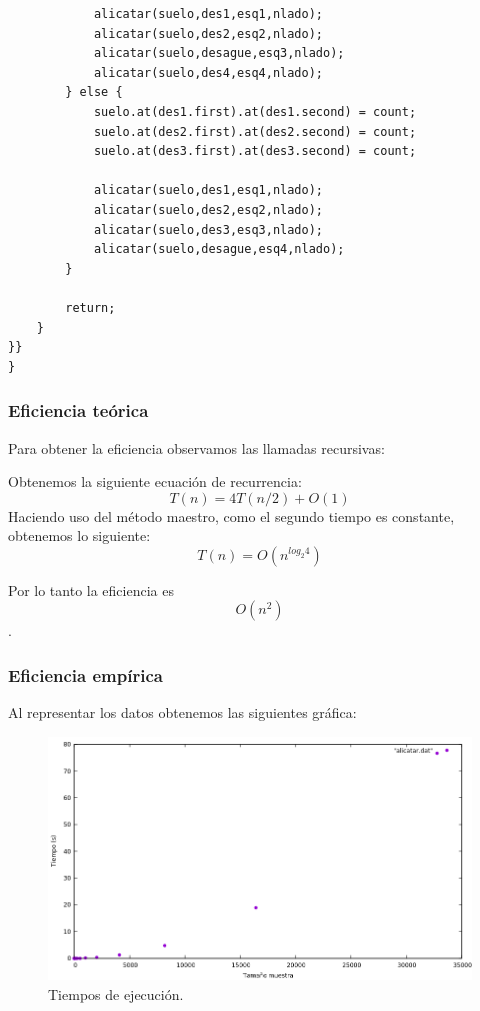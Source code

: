 \begin{lstlisting}
            alicatar(suelo,des1,esq1,nlado);
            alicatar(suelo,des2,esq2,nlado);
            alicatar(suelo,desague,esq3,nlado);
            alicatar(suelo,des4,esq4,nlado);
        } else {
            suelo.at(des1.first).at(des1.second) = count;
            suelo.at(des2.first).at(des2.second) = count;
            suelo.at(des3.first).at(des3.second) = count;

            alicatar(suelo,des1,esq1,nlado);
            alicatar(suelo,des2,esq2,nlado);
            alicatar(suelo,des3,esq3,nlado);
            alicatar(suelo,desague,esq4,nlado);
        }

        return;
    }
}}    
}
\end{lstlisting}


\subsubsection{Eficiencia teórica}

Para obtener la eficiencia observamos las llamadas recursivas:

 Obtenemos la siguiente ecuación de recurrencia:
  \begin{equation}
      T(n) = 4T(n/2) + O(1)
  \end{equation}
  Haciendo uso del método maestro, como el segundo tiempo es constante, obtenemos lo siguiente:
  \begin{equation}
      T(n) = O(n^{log_2{4}})
  \end{equation}
  
  Por lo tanto la eficiencia es
  \begin{equation} O(n^2 ) \end{equation}.
  

\subsubsection{Eficiencia empírica}

Al representar los datos obtenemos las siguientes gráfica:

\begin{figure}[H]
    \begin{center}
        \includegraphics[scale=0.7]{imagenes/g_a.png}
        \caption{Tiempos de ejecución.}
        \label{fig11}
    \end{center}
\end{figure}


